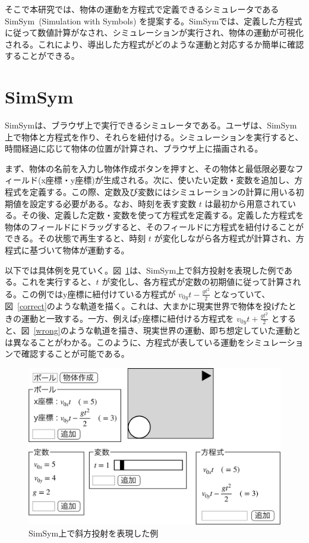 \documentclass[11pt, a4paper, oneside, twocolumn, dvipdfmx]{jsarticle}
\newcommand{\simname}{SimSym}
\newcommand{\simnamealt}{Simulation with Symbols}
\begin{document}
そこで本研究では、物体の運動を方程式で定義できるシミュレータである \simname~(\simnamealt) を提案する。\simname では、定義した方程式に従って数値計算がなされ、シミュレーションが実行され、物体の運動が可視化される。これにより、導出した方程式がどのような運動と対応するか簡単に確認することができる。

\section{\simname}

\simname は、ブラウザ上で実行できるシミュレータである。ユーザは、\simname 上で物体と方程式を作り、それらを紐付ける。シミュレーションを実行すると、時間経過に応じて物体の位置が計算され、ブラウザ上に描画される。

まず、物体の名前を入力し物体作成ボタンを押すと、その物体と最低限必要なフィールド(x座標・y座標)が生成される。次に、使いたい定数・変数を追加し、方程式を定義する。この際、定数及び変数にはシミュレーションの計算に用いる初期値を設定する必要がある。なお、時刻を表す変数 $t$ は最初から用意されている。その後、定義した定数・変数を使って方程式を定義する。定義した方程式を物体のフィールドにドラッグすると、そのフィールドに方程式を紐付けることができる。その状態で再生すると、時刻 $t$ が変化しながら各方程式が計算され、方程式に基づいて物体が運動する。

以下では具体例を見ていく。図~\ref{simsym_fig1}は、\simname 上で斜方投射を表現した例である。これを実行すると、$t$ が変化し、各方程式が定数の初期値に従って計算される。この例ではy座標に紐付けている方程式が $v_{0y}t - \frac{gt^2}{2}$ となっていて、図~\ref{correct}のような軌道を描く。これは、大まかに現実世界で物体を投げたときの運動と一致する。一方、例えばy座標に紐付ける方程式を $v_{0y}t + \frac{gt^2}{2}$ とすると、図~\ref{wrong}のような軌道を描き、現実世界の運動、即ち想定していた運動とは異なることがわかる。このように、方程式が表している運動をシミュレーションで確認することが可能である。

\begin{figure}[htb]
  \centering
  \includegraphics*[width=0.9\linewidth]{work/slide_img3-crop.pdf}
  \caption{\simname 上で斜方投射を表現した例} \label{simsym_fig1}
\end{figure}
\end{document}
